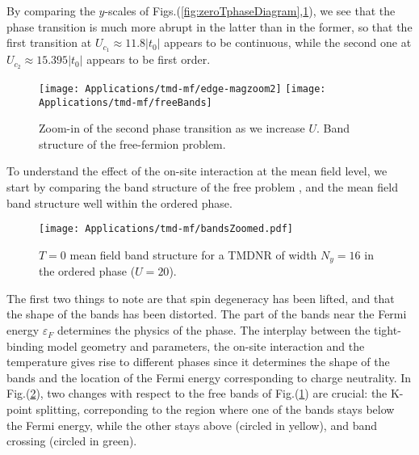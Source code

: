 By comparing the $y$-scales of Figs.(\ref{fig:zeroTphaseDiagram},\ref{fig:freeBands}), we see that the phase transition is much more abrupt in the latter than in the former, so that the first transition at $U_{c_1} \approx 11.8 |t_0|$ appears to be continuous, while the second one at $U_{c_2} \approx 15.395 |t_0|$ appears to be first order.
\begin{figure}[H]
\texttt{[image: Applications/tmd-mf/edge-magzoom2]}
\hspace{0.5cm}
\texttt{[image: Applications/tmd-mf/freeBands]}
	\caption[Zoom-in of the second phase transition as we increase $U$. Band structure of the free-fermion problem.]{Zoom-in of the second phase transition as we increase $U$. Band structure of the free-fermion problem.
	\label{fig:freeBands}}
\end{figure}
To understand the effect of the on-site interaction at the mean field level, we start by comparing the band structure of the free problem , and the mean field band structure well within the ordered phase.
\begin{figure}[H]
\centering
\texttt{[image: Applications/tmd-mf/bandsZoomed.pdf]}
	\caption[$T=0$ mean field band structure for a \ac{TMDNR} of width $N_y = 16$ in the ordered phase, at $U=20$.]{$T=0$ mean field band structure for a \ac{TMDNR} of width $N_y = 16$ in the ordered phase ($U=20$).}
	\label{fig:bandsZoomed}
\end{figure}

The first two things to note are that spin degeneracy has been lifted, and that the shape of the bands has been distorted.
The part of the bands near the Fermi energy $\varepsilon_F$ determines the physics of the phase.
The interplay between the tight-binding model geometry and parameters, the on-site interaction and the temperature gives rise to different phases since it determines the shape of the bands and the location of the Fermi energy corresponding to charge neutrality.
In Fig.(\ref{fig:bandsZoomed}), two changes with respect to the free bands of Fig.(\ref{fig:freeBands}) are crucial:
the K-point splitting, correponding to the region where one of the bands stays below the Fermi energy, while the other stays above (circled in yellow), and band crossing (circled in green).

